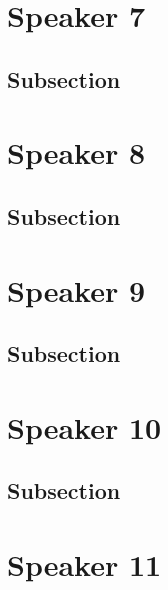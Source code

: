 \documentclass[
]{book}
\begin{document}
\hypertarget{speaker-7}{%
\chapter*{Speaker 7}\label{speaker-7}}

\hypertarget{subsection}{%
\section{Subsection}\label{subsection}}

\hypertarget{speaker-8}{%
\chapter*{Speaker 8}\label{speaker-8}}

\hypertarget{subsection-1}{%
\section{Subsection}\label{subsection-1}}

\hypertarget{speaker-9}{%
\chapter*{Speaker 9}\label{speaker-9}}

\hypertarget{subsection-2}{%
\section{Subsection}\label{subsection-2}}

\hypertarget{speaker-10}{%
\chapter*{Speaker 10}\label{speaker-10}}

\hypertarget{subsection-3}{%
\section{Subsection}\label{subsection-3}}

\hypertarget{speaker-11}{%
\chapter*{Speaker 11}\label{speaker-11}}
\end{document}
